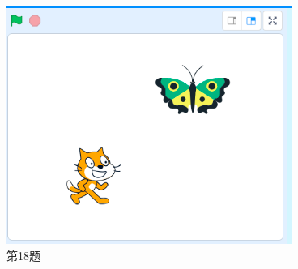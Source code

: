 \documentclass[10pt, a4paper]{article}
\begin{document}
\begin{enumerate}
       \begin{figure}[htbp]
            \centering
            \begin{minipage}[t]{.15\textwidth}
                \centering
                \includegraphics[width=\textwidth]{18.png}
                \caption*{第18题}
            \end{minipage}
            \begin{minipage}[t]{.2\textwidth}
                \centering
                \begin{minipage}[t]{.48\textwidth}
                    \centering

\end{minipage}
\end{minipage}
\end{figure}
\end{enumerate}
\end{document}
